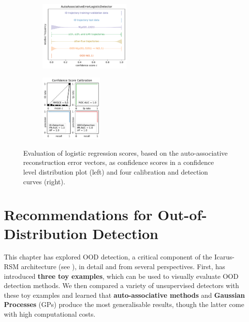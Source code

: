 \begin{figure}[H]
    \centering
    \begin{subfigure}
        \centering
        \includegraphics[width=0.505\textwidth,valign=t]{ood-detection/figures/confidence-score/ood.autoassociativeerrorlogisticdetector-distribution.pdf}
    \end{subfigure}
    \begin{subfigure}
        \centering
        \includegraphics[width=0.345\textwidth,valign=t]{ood-detection/figures/confidence-score/ood.autoassociativeerrorlogisticdetector-calibration.pdf}
    \end{subfigure}

    \caption[Evaluation of Error-based Logistic Regression Scores as Confidence Scores]{Evaluation of logistic regression scores, based on the auto-associative reconstruction error vectors, as confidence scores in a confidence level distribution plot (left) and four calibration and detection curves (right).}
    \label{fig:logistic-error-ood-scoring}
\end{figure}

\vspace{-1.5em}
\section{Recommendations for Out-of-Distribution Detection} \label{txt:ood-recommendations}

This chapter has explored OOD detection, a critical component of the Icarus-RSM architecture (see ), in detail and from several perspectives. First,  has introduced \textbf{three toy examples}, which can be used to visually evaluate OOD detection methods. We then compared a variety of unsupervised detectors with these toy examples and learned that \textbf{auto-associative methods} and \textbf{Gaussian Processes} (GPs) produce the most generalisable results, though the latter come with high computational costs.

